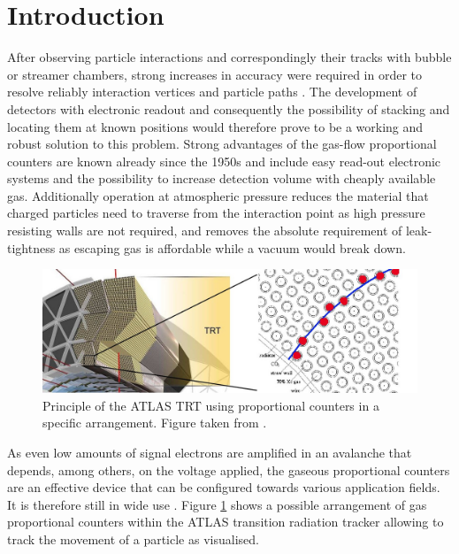 \section{Introduction}  \label{sec:Introduction}
After observing particle interactions and correspondingly their tracks with
bubble or streamer chambers, strong increases in accuracy were required in order
to resolve reliably interaction vertices and particle paths \cite{charpak_high-resolution_1984}.
The development of detectors with electronic readout and consequently the
possibility of stacking and locating them at known positions would therefore
prove to be a working and robust solution to this problem. Strong advantages of
the gas-flow proportional counters are known already since the 1950s \cite{hendee_gasflow_1956} and include
easy read-out electronic systems and the possibility to increase detection volume
with cheaply available gas. Additionally operation at atmospheric pressure
reduces the material that charged particles need to traverse from the
interaction point as high pressure resisting walls are not required, and removes
the absolute requirement of leak-tightness as escaping gas is affordable while a
vacuum would break down.

\begin{figure}[htb!]
  \includegraphics[width=\linewidth]{graphics/ATLAS_TRT_Principle_image}
  \caption{Principle of the ATLAS TRT using proportional counters in a specific
    arrangement. Figure taken from \cite{colliderscope}.}
  \label{fig:colliderscope}
\end{figure}

As even low amounts of signal electrons are amplified in an
avalanche that depends, among others, on the voltage applied, the gaseous
proportional counters are an effective device that can be configured towards
various application fields. It is therefore still in wide use
\cite{Mindur:2017nqn}. Figure \ref{fig:colliderscope} shows a possible
arrangement of gas proportional counters within the ATLAS transition radiation
tracker allowing to track the movement of a particle as visualised.

